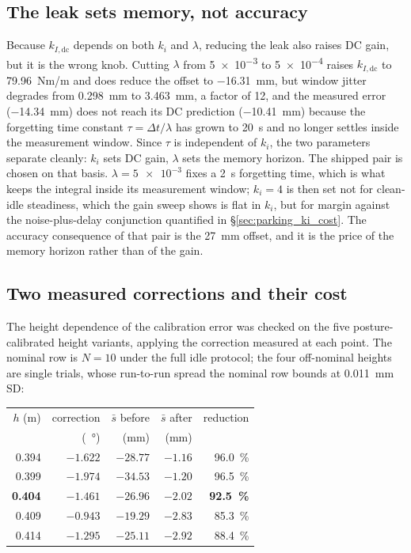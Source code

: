 \documentclass[conference]{IEEEtran}
\begin{document}
\subsection{The leak sets memory, not accuracy}

Because $k_{I,\text{dc}}$ depends on both $k_i$ and $\lambda$, reducing the leak also raises DC gain, but it is the wrong knob. Cutting
$\lambda$ from \num{5e-3} to \num{5e-4} raises $k_{I,\text{dc}}$ to
\SI{79.96}{Nm/m} and does reduce the offset to \SI{-16.31}{mm}, but window
jitter degrades from \SI{0.298}{mm} to \SI{3.463}{mm}, a factor of \num{12},
and the measured error (\SI{-14.34}{mm}) does not reach its DC prediction
(\SI{-10.41}{mm}) because the forgetting time constant
$\tau{=}\Delta t/\lambda$ has grown to \SI{20}{s} and no longer settles inside
the measurement window. Since $\tau$ is independent of $k_i$, the two
parameters separate cleanly: $k_i$ sets DC gain, $\lambda$ sets the memory
horizon. The shipped pair is chosen on that basis. $\lambda{=}\num{5e-3}$ fixes
a \SI{2}{s} forgetting time, which is what keeps the integral inside its
measurement window; $k_i{=}\num{4}$ is then set not for clean-idle steadiness,
which the gain sweep shows is flat in $k_i$, but for margin against the
noise-plus-delay conjunction quantified in \S\ref{sec:parking_ki_cost}. The
accuracy consequence of that pair is the \SI{27}{mm} offset, and it is the price
of the memory horizon rather than of the gain.

\subsection{Two measured corrections and their cost}

The height dependence of the calibration error was checked on the five
posture-calibrated height variants, applying the correction measured at each
point. The nominal row is $N{=}10$ under the full idle protocol; the four
off-nominal heights are single trials, whose run-to-run spread the nominal
row bounds at \SI{0.011}{mm} SD:

\begin{center}\footnotesize
\begin{tabular}{rrrrr}
\hline
$h$ (m) & correction & $\bar{s}$ before & $\bar{s}$ after & reduction \\
 & (\SI{}{\degree}) & (mm) & (mm) & \\
\hline
0.394 & $-1.622$ & $-28.77$ & $-1.16$ & \SI{96.0}{\percent} \\
0.399 & $-1.974$ & $-34.53$ & $-1.20$ & \SI{96.5}{\percent} \\
\textbf{0.404} & $\mathbf{-1.461}$ & $\mathbf{-26.96}$ & $\mathbf{-2.02}$ & \textbf{\SI{92.5}{\percent}} \\
0.409 & $-0.943$ & $-19.29$ & $-2.83$ & \SI{85.3}{\percent} \\
0.414 & $-1.295$ & $-25.11$ & $-2.92$ & \SI{88.4}{\percent} \\
\hline
\end{tabular}
\end{center}
\end{document}
